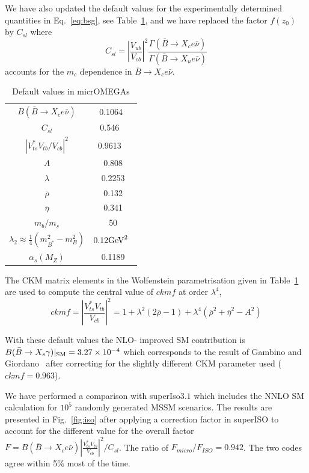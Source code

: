 \documentclass[12pt,a4paper]{article}
\begin{document}
We have also updated the default values for the experimentally determined quantities in
Eq.~\ref{eq:bsg}, see Table~\ref{tab:def}, and we have replaced the factor $f(z_0)$ by $C_{sl}$ where
\begin{equation}
C_{sl}=\left|\frac{V_{ub}}{V_{cb}}\right|^2 \frac{\Gamma(\bar{B}\rightarrow X_c e\bar\nu)}{\Gamma(\bar{B}\rightarrow X_u e\bar\nu)}
\end{equation}
accounts for the $m_c$ dependence in $\bar{B}\rightarrow X_c e\bar\nu$.



\begin{table}
\begin{center}
\begin{tabular}{|c|c|}
\hline
$B(\bar{B}\rightarrow X_c e\bar\nu)$ & 0.1064~\cite{Nakamura:2010zzi}\\
$C_{sl}$ & 0.546 ~\cite{Gambino:2008fj}\\
$|V_{ts}^*V_{tb}/V_{cb}|^2$ & 0.9613 ~\cite{Nakamura:2010zzi}\\
$A$& 0.808\\
$\lambda$ & 0.2253\\
$\bar{\rho}$ & 0.132\\
$\bar{\eta}$ &0.341 \\
$m_b/m_s$  & 50\\
$\lambda_2\approx \frac{1}{4} (m^2_{B^*}-m^2_B)$ &  $0.12 {\rm GeV}^2$~\cite{Yao:2006px}\\
$\alpha_s(M_Z)$ &0.1189 \\\hline
\end{tabular}
\caption{Default values in micrOMEGAs }
\end{center}
\label{tab:def}
\end{table}

The CKM matrix elements in the Wolfenstein parametrisation given in Table~\ref{tab:def}
are used to compute the central value of $ckmf$  at order $\lambda^4$,
\begin{equation}
ckmf=\left|\frac{V_{ts}^*V_{tb}}{V_{cb}}\right|^2=1+\lambda^2 (2\bar{\rho}-1) +
\lambda^4 (\bar\rho^2+\bar\eta^2-A^2)
\end{equation}


With these default values  the NLO- improved SM contribution 
is $B(\bar{B}\rightarrow X_s \gamma)|_{\rm SM}=3.27\times 10^{-4}$ which corresponds to the result of Gambino
and Giordano~\cite{Gambino:2008fj} after correcting for the slightly different CKM parameter used ($ckmf=0.963$).

We have performed a comparison with superIso$3.1$ which includes the NNLO SM calculation for 
$10^5$ randomly generated MSSM scenarios. The results are presented in Fig.~\ref{fig:iso}  after applying a
correction factor in superISO to account for the different value for the overall factor
$F=B(\bar{B}\rightarrow X_c e\bar\nu) \left|\frac{V_{ts}^* V_{tb}}
{V_{cb}}\right|^2/C_{sl}$. The ratio of $F_{micro}/F_{ISO}=0.942$.
The two codes agree within 5\% most of the time. 
\end{document}

